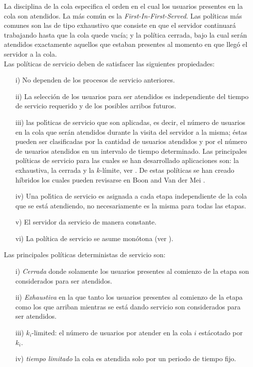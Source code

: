 \documentclass{article}
\numberwithin{equation}{section}
\begin{document}
La disciplina de la cola especifica el orden en el cual los usuarios presentes en la cola son atendidos. La m\'as com\'un es la {\em First-In-First-Served}. Las pol\'iticas m\'as comunes son las de tipo exhaustivo que consiste en que el servidor continuar\'a trabajando hasta que la cola quede vac\'ia; y la pol\'itica cerrada, bajo la cual ser\'an atendidos exactamente aquellos que estaban presentes al momento en que lleg\'o el servidor a la cola. \\

Las pol\'iticas de servicio deben de satisfacer las siguientes propiedades:
\begin{itemize}
\item[i)] No dependen de los procesos de servicio anteriores.
\item[ii)] La selecci\'on de los usuarios para ser atendidos es independiente del tiempo de servicio requerido  y de los posibles arribos futuros.
\item[iii)] las pol{\'\i}ticas de servicio que son aplicadas, es decir, el n\'umero de usuarios en la cola que ser{\'a}n atendidos durante la visita del servidor a la misma; \'estas pueden ser clasificadas por la cantidad de usuarios atendidos y por el n\'umero de usuarios atendidos en un intervalo de tiempo determinado. Las principales pol\'iticas de servicio para las cuales se han desarrollado aplicaciones son: la exhaustiva, la cerrada y la $k$-l\'imite, ver \cite{LevySidi, Takagi, Semenova}. De estas pol\'iticas se han creado h\'ibridos los cuales pueden revisarse en Boon and Van der Mei \cite{BoonMeiWinands}.

\item[iv)] Una pol{\'\i}tica de servicio es asignada a cada etapa independiente de la cola que se est{\'a} atendiendo, no necesariamente es la misma para todas las etapas.
\item[v)] El servidor da servicio de manera constante.

\item[vi)] La pol\'itica de servicio se asume mon\'otona (ver
\cite{Stability}).

\end{itemize}

Las principales pol\'iticas deterministas de servicio son:
\begin{itemize}

\item[i)] {\em Cerrada} donde solamente los usuarios presentes al comienzo de la etapa son considerados para ser atendidos.

\item[ii)] {\em Exhaustiva} en la que tanto los usuarios presentes al comienzo de la etapa como los que arriban   mientras se est\'a dando servicio son considerados para ser atendidos.

\item[iii)] $k_{i}$-limited: el n\'umero de usuarios por atender en la cola $i$ est\' acotado por $k_{i}$.

\item[iv)] {\em tiempo limitado} la cola es atendida solo por un periodo de tiempo fijo.
\end{itemize}
\end{document}
